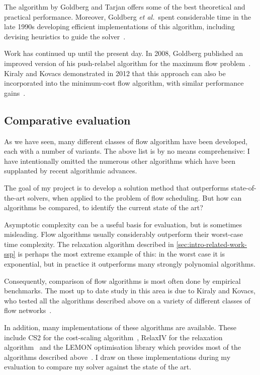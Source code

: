The algorithm by Goldberg and Tarjan offers some of the best theoretical and practical performance. Moreover, Goldberg \textit{et al.}\ spent considerable time in the late 1990s developing efficient implementations of this algorithm, including devising heuristics to guide the solver~\cite{Goldberg:1997,Bunnagel:1998}.

Work has continued up until the present day. In 2008, Goldberg published an improved version of his push-relabel algorithm for the maximum flow problem~\cite{Goldberg:2008}. Kiraly and Kovacs demonstrated in 2012 that this approach can also be incorporated into the minimum-cost flow algorithm, with similar performance gains~\cite{KiralyKovacs:2012}.

\subsection{Comparative evaluation}

As we have seen, many different classes of flow algorithm have been developed, each with a number of variants. The above list is by no means comprehensive: I have intentionally omitted the numerous other algorithms which have been supplanted by recent algorithmic advances.

The goal of my project is to develop a solution method that outperforms state-of-the-art solvers, when applied to the problem of flow scheduling. But how can algorithms be compared, to identify the current state of the art? 

Asymptotic complexity can be a useful basis for evaluation, but is sometimes misleading. Flow algorithms usually considerably outperform their worst-case time complexity. The relaxation algorithm described in \cref{sec:intro-related-work-ssp} is perhaps the most extreme example of this: in the worst case it is exponential, but in practice it outperforms many strongly polynomial algorithms.

Consequently, comparison of flow algorithms is most often done by empirical benchmarks. The most up to date study in this area is due to Kiraly and Kovacs, who tested all the algorithms described above on a variety of different classes of flow networks~\cite{KiralyKovacs:2012,Kovacs:2015}.

In addition, many implementations of these algorithms are available. These include CS2 for the cost-scaling algorithm~\cite{CS2:2009}, RelaxIV for the relaxation algorithm~\cite{RelaxIV:2011} and the LEMON optimisation library which provides most of the algorithms described above~\cite{LEMON:2011,LEMON:Software}. I draw on these implementations during my evaluation to compare my solver against the state of the art.